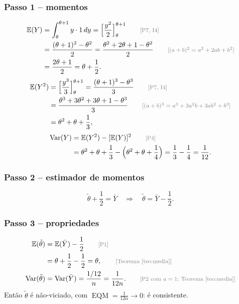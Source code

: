 \documentclass[11pt,a4paper]{article}
\theoremstyle{definition}
\theoremstyle{plain}
\newcommand{\E}{\mathbb{E}}
\newcommand{\Var}{\operatorname{Var}}
\newcommand{\EQM}{\operatorname{EQM}}
\newcommand{\bY}{\bar{Y}}
\newcommand{\just}[1]{\tag*{\footnotesize\textcolor{gray}{[#1]}}}
\begin{document}
\subsubsection*{Passo 1 -- momentos}
\begin{align*}
\E(Y)&=\int_\theta^{\theta+1}y\cdot1\,dy=\Big[\frac{y^2}{2}\Big]_\theta^{\theta+1} \just{P7, I4}\\
&=\frac{(\theta+1)^2-\theta^2}{2}
=\frac{\theta^2+2\theta+1-\theta^2}{2} \just{$(a+b)^2=a^2+2ab+b^2$}\\
&=\frac{2\theta+1}{2}=\theta+\frac12 .
\end{align*}
\begin{align*}
\E(Y^2)&=\Big[\frac{y^3}{3}\Big]_\theta^{\theta+1}=\frac{(\theta+1)^3-\theta^3}{3} \just{P7, I4}\\
&=\frac{\theta^3+3\theta^2+3\theta+1-\theta^3}{3} \just{$(a+b)^3=a^3+3a^2b+3ab^2+b^3$}\\
&=\theta^2+\theta+\frac13,
\end{align*}
\begin{align*}
\Var(Y)&=\E(Y^2)-[\E(Y)]^2 \just{P4}\\
&=\theta^2+\theta+\frac13-\Big(\theta^2+\theta+\frac14\Big)
=\frac13-\frac14=\frac1{12}.
\end{align*}

\subsubsection*{Passo 2 -- estimador de momentos}
\[
\tilde\theta+\frac12=\bY\quad\Longrightarrow\quad\tilde\theta=\bY-\frac12 .
\]

\subsubsection*{Passo 3 -- propriedades}
\begin{align*}
\E(\tilde\theta)&=\E(\bY)-\frac12 \just{P1}\\
&=\theta+\frac12-\frac12=\theta, \just{Teorema~\ref{teo:media}}\\
\Var(\tilde\theta)&=\Var(\bY)=\frac{1/12}{n}=\frac{1}{12n}. \just{P2 com $a=1$; Teorema~\ref{teo:media}}
\end{align*}
Então $\tilde\theta$ é não-viciado, com $\EQM=\frac1{12n}\to0$: é consistente.
\end{document}

